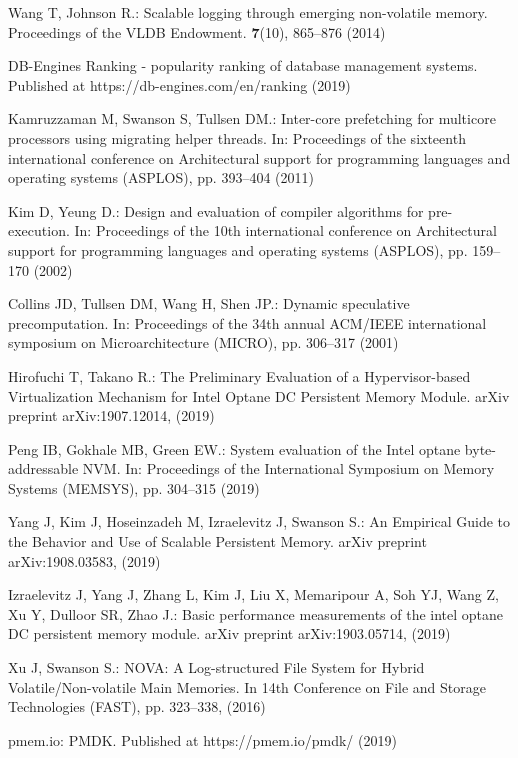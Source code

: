 Wang T, Johnson R.: Scalable logging through emerging non-volatile memory. Proceedings of the VLDB Endowment. \textbf{7}(10), 865--876 (2014)

DB-Engines Ranking - popularity ranking of database management systems. Published at https://db-engines.com/en/ranking (2019)

Kamruzzaman M, Swanson S, Tullsen DM.: Inter-core prefetching for multicore processors using migrating helper threads. In: Proceedings of the sixteenth international conference on Architectural support for programming languages and operating systems (ASPLOS), pp. 393--404 (2011)

Kim D, Yeung D.: Design and evaluation of compiler algorithms for pre-execution. In: Proceedings of the 10th international conference on Architectural support for programming languages and operating systems (ASPLOS), pp. 159--170  (2002)

Collins JD, Tullsen DM, Wang H, Shen JP.: Dynamic speculative precomputation. In: Proceedings of the 34th annual ACM/IEEE international symposium on Microarchitecture (MICRO), pp. 306--317 (2001)

Hirofuchi T, Takano R.: The Preliminary Evaluation of a Hypervisor-based Virtualization Mechanism for Intel Optane DC Persistent Memory Module. arXiv preprint arXiv:1907.12014, (2019)

Peng IB, Gokhale MB, Green EW.: System evaluation of the Intel optane byte-addressable NVM. In: Proceedings of the International Symposium on Memory Systems (MEMSYS), pp. 304--315 (2019)

Yang J, Kim J, Hoseinzadeh M, Izraelevitz J, Swanson S.: An Empirical Guide to the Behavior and Use of Scalable Persistent Memory. arXiv preprint arXiv:1908.03583, (2019)

Izraelevitz J, Yang J, Zhang L, Kim J, Liu X, Memaripour A, Soh YJ, Wang Z, Xu Y, Dulloor SR, Zhao J.: Basic performance measurements of the intel optane DC persistent memory module. arXiv preprint arXiv:1903.05714, (2019)

Xu J, Swanson S.: NOVA: A Log-structured File System for Hybrid Volatile/Non-volatile Main Memories. In 14th Conference on File and Storage Technologies (FAST), pp. 323--338, (2016)

pmem.io: PMDK. Published at https://pmem.io/pmdk/ (2019)
